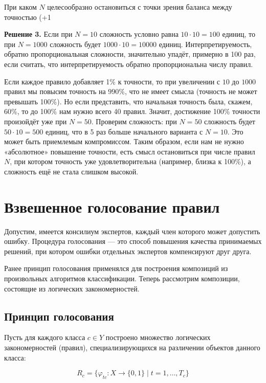     При каком $N$ целесообразно остановиться с точки зрения баланса между точностью (+1%

\textbf{Решение 3.}
Если при $N=10$ сложность условно равна $10 \cdot 10 = 100$ единиц, то при $N=1000$ сложность будет $1000 \cdot 10 = 10000$ единиц. Интерпретируемость, обратно пропорциональная сложности, значительно упадёт, примерно в 100 раз, если считать, что интерпретируемость обратно пропорциональна числу правил.

    Если каждое правило добавляет 1\% к точности, то при увеличении с $10$ до $1000$ правил мы повысим точность на $990\%$, что не имеет смысла (точность не может превышать 100\%). Но если представить, что начальная точность была, скажем, 60\%, то до 100\% нам нужно всего 40 правил. Значит, достижение 100\% точности произойдёт уже при $N=50$. Проверим сложность: при $N=50$ сложность будет $50 \cdot 10 = 500$ единиц, что в 5 раз больше начального варианта с $N=10$. Это может быть приемлемым компромиссом. Таким образом, если нам не нужно «абсолютное» повышение точности, есть смысл остановиться при числе правил $N$, при котором точность уже удовлетворительна (например, близка к 100\%), а сложность ещё не стала слишком высокой.






\section{Взвешенное голосование правил}

Допустим, имеется консилиум экспертов, каждый член которого может допустить ошибку. Процедура голосования — это способ повышения качества принимаемых решений, при котором ошибки отдельных экспертов компенсируют друг друга.

Ранее принцип голосования применялся для построения композиций из произвольных алгоритмов классификации. Теперь рассмотрим композиции, состоящие из логических закономерностей.

\subsection{Принцип голосования}

Пусть для каждого класса $c \in Y$ построено множество логических закономерностей (правил), специализирующихся на различении объектов данного класса:

\[
R_c = \{ \varphi_{tc} : X \to \{0, 1\} \mid t = 1, \dots, T_c \}
\]

